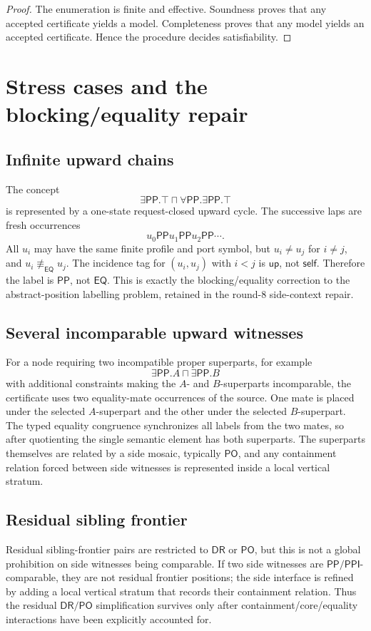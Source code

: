 \documentclass[11pt]{article}
\newcommand{\EQ}{\mathsf{EQ}}
\newcommand{\PP}{\mathsf{PP}}
\newcommand{\PPI}{\mathsf{PPI}}
\newcommand{\PO}{\mathsf{PO}}
\newcommand{\DR}{\mathsf{DR}}
\newcommand{\eqc}{\equiv_{\EQ}}
\newcommand{\self}{\mathsf{self}}
\newcommand{\up}{\mathsf{up}}
\begin{document}
\begin{proof}
The enumeration is finite and effective.  Soundness proves that any accepted certificate yields a model.  Completeness proves that any model yields an accepted certificate.  Hence the procedure decides satisfiability.
\end{proof}

\section{Stress cases and the blocking/equality repair}

\subsection{Infinite upward chains}
The concept
\[
  \exists\PP.\top\sqcap\forall\PP.\exists\PP.\top
\]
is represented by a one-state request-closed upward cycle.  The successive laps are fresh occurrences
\[
  u_0\PP u_1\PP u_2\PP\cdots.
\]
All \(u_i\) may have the same finite profile and port symbol, but \(u_i\ne u_j\) for \(i\ne j\), and \(u_i\not\eqc u_j\).  The incidence tag for \((u_i,u_j)\) with \(i<j\) is \(\up\), not \(\self\).  Therefore the label is \(\PP\), not \(\EQ\).  This is exactly the blocking/equality correction to the abstract-position labelling problem, retained in the round-8 side-context repair.

\subsection{Several incomparable upward witnesses}
For a node requiring two incompatible proper superparts, for example
\[
\exists\PP.A\sqcap\exists\PP.B
\]
with additional constraints making the \(A\)- and \(B\)-superparts incomparable, the certificate uses two equality-mate occurrences of the source.  One mate is placed under the selected \(A\)-superpart and the other under the selected \(B\)-superpart.  The typed equality congruence synchronizes all labels from the two mates, so after quotienting the single semantic element has both superparts.  The superparts themselves are related by a side mosaic, typically \(\PO\), and any containment relation forced between side witnesses is represented inside a local vertical stratum.

\subsection{Residual sibling frontier}
Residual sibling-frontier pairs are restricted to \(\DR\) or \(\PO\), but this is not a global prohibition on side witnesses being comparable.  If two side witnesses are \(\PP/\PPI\)-comparable, they are not residual frontier positions; the side interface is refined by adding a local vertical stratum that records their containment relation.  Thus the residual \(\DR/\PO\) simplification survives only after containment/core/equality interactions have been explicitly accounted for.
\end{document}
